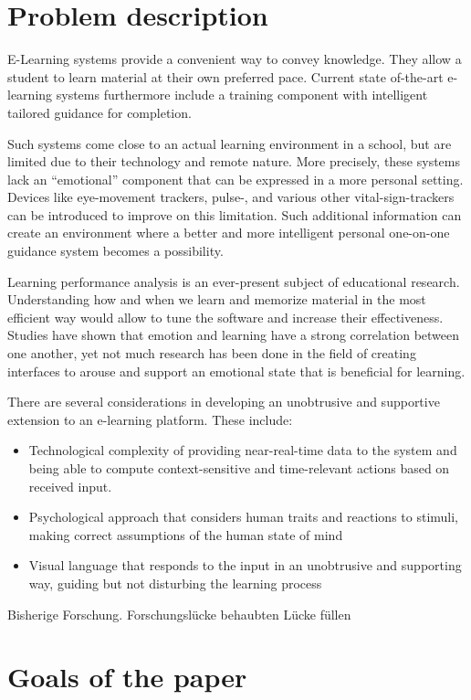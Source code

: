 \section {Problem description}

E-Learning systems provide a convenient way to convey knowledge. They allow a student to learn material at their own preferred pace. 
Current state of-the-art e-learning systems furthermore include a training component with intelligent tailored guidance for completion. 

Such systems come close to an actual learning environment in a school, but are limited due to their technology and remote nature. More precisely, these systems lack an “emotional” component that can be expressed in a more personal setting. Devices like eye-movement trackers, pulse-, and various other vital-sign-trackers can be introduced to improve on this limitation. Such additional information can create an environment where a better and more intelligent personal one-on-one guidance system becomes a possibility.

Learning performance analysis is an ever-present subject of educational research. Understanding how and when we learn and memorize material in the most efficient way would allow to tune the software and increase their effectiveness. Studies have shown that emotion and learning have a strong correlation between one another, yet not much research has been done in the field of creating interfaces to arouse and support an emotional state that is beneficial for learning. 

There are several considerations in developing an unobtrusive and supportive extension to an e-learning platform. These include:
\begin{itemize}
	\item Technological complexity of providing near-real-time data to the system and being able to compute context-sensitive and time-relevant actions based on received input.
	\item Psychological approach that considers human traits and reactions to stimuli, making correct assumptions of the human state of mind
	\item Visual language that responds to the input in an unobtrusive and supporting way, guiding but not disturbing the learning process
\end{itemize}

Bisherige Forschung.
Forschungslücke behaubten
Lücke füllen

\section{Goals of the paper}

